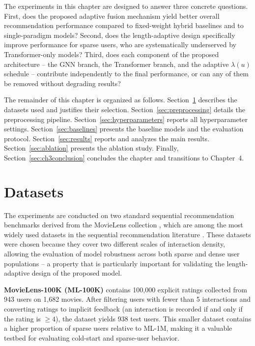 \documentclass[12pt,a4paper]{report}
\begin{document}
The experiments in this chapter are designed to answer three concrete
questions. First, does the proposed adaptive fusion mechanism yield better
overall recommendation performance compared to fixed-weight hybrid baselines
and to single-paradigm models? Second, does the length-adaptive design
specifically improve performance for sparse users, who are systematically
underserved by Transformer-only models? Third, does each component of the
proposed architecture -- the GNN branch, the Transformer branch, and the
adaptive \(\lambda(u)\) schedule -- contribute independently to the final
performance, or can any of them be removed without degrading results?

The remainder of this chapter is organized as follows.
Section~\ref{sec:datasets} describes the datasets used and justifies their
selection. Section~\ref{sec:preprocessing} details the preprocessing pipeline.
Section~\ref{sec:hyperparameters} reports all hyperparameter settings.
Section~\ref{sec:baselines} presents the baseline models and the evaluation
protocol. Section~\ref{sec:results} reports and analyzes the main results.
Section~\ref{sec:ablation} presents the ablation study. Finally,
Section~\ref{sec:ch3conclusion} concludes the chapter and transitions to
Chapter~4.

\section{Datasets}
\label{sec:datasets}

\justifying
The experiments are conducted on two standard sequential recommendation
benchmarks derived from the MovieLens collection \citep{harper2015movielens},
which are among the most widely used datasets in the sequential recommendation
literature \citep{pan2024survey, kang2018sasrec, sun2019bert4rec}. These
datasets were chosen because they cover two different scales of interaction
density, allowing the evaluation of model robustness across both sparse and
dense user populations -- a property that is particularly important for
validating the length-adaptive design of the proposed model.

\textbf{MovieLens-100K (ML-100K)} contains 100,000 explicit ratings collected
from 943 users on 1,682 movies. After filtering users with fewer than 5
interactions and converting ratings to implicit feedback (an interaction is
recorded if and only if the rating is \(\geq 4\)), the dataset yields 938 test users. This
smaller dataset contains a higher proportion of sparse users relative to
ML-1M, making it a valuable testbed for evaluating cold-start and sparse-user
behavior.
\end{document}
